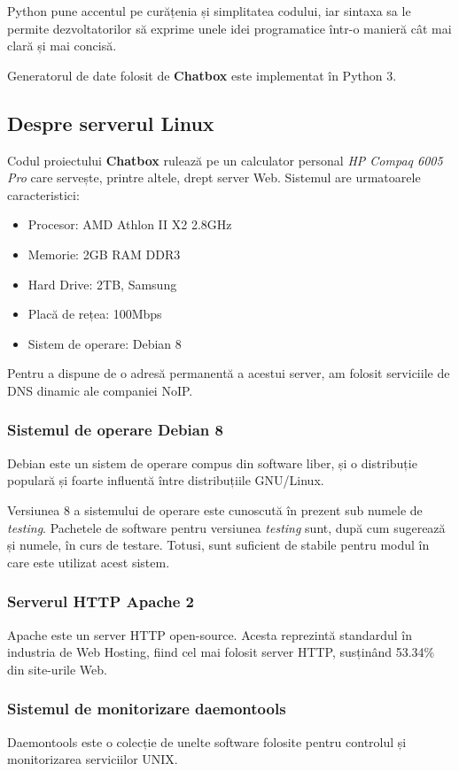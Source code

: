 \documentclass[12pt,a4paper]{article}
\begin{document}
Python pune accentul pe curățenia și simplitatea codului, iar sintaxa sa le permite dezvoltatorilor să exprime unele idei programatice într-o manieră cât mai clară și mai concisă.

Generatorul de date folosit de \textbf{Chatbox} este implementat  în Python 3.

\subsection{Despre serverul Linux}
Codul proiectului \textbf{Chatbox} rulează pe un calculator personal
 \textit{HP Compaq 6005 Pro}
care servește, printre altele, drept server Web. 
Sistemul are urmatoarele caracteristici:
\begin{itemize}
  \item Procesor: AMD Athlon II X2 2.8GHz
  \item Memorie: 2GB RAM DDR3
  \item Hard Drive: 2TB, Samsung
  \item Placă de rețea: 100Mbps
  \item Sistem de operare: Debian 8
\end{itemize}

Pentru a dispune de o adresă permanentă a acestui server, 
am folosit serviciile de DNS dinamic ale companiei NoIP\cite{noip}.

\subsubsection{Sistemul de operare Debian 8}
Debian\cite{debian} este un sistem de operare compus din software liber\cite{free}, și o distribuție populară și foarte influentă între distribuțiile GNU/Linux.

Versiunea 8 a sistemului de operare este cunoscută în prezent sub 
numele de \textit{testing}. Pachetele de software pentru versiunea 
\textit{testing} sunt, după cum sugerează și numele, în curs de testare.
Totusi, sunt suficient de stabile pentru modul  în care 
este utilizat acest sistem.

\subsubsection{Serverul HTTP Apache 2}
Apache este un server HTTP open-source. Acesta reprezintă standardul în 
industria de Web Hosting, fiind cel mai folosit server HTTP, susținând 
53.34\% din site-urile Web\cite{apache53}.

\subsubsection{Sistemul de monitorizare daemontools}
Daemontools\cite{daemon} este o colecție de unelte software folosite pentru 
controlul și monitorizarea serviciilor UNIX. 
\end{document}
